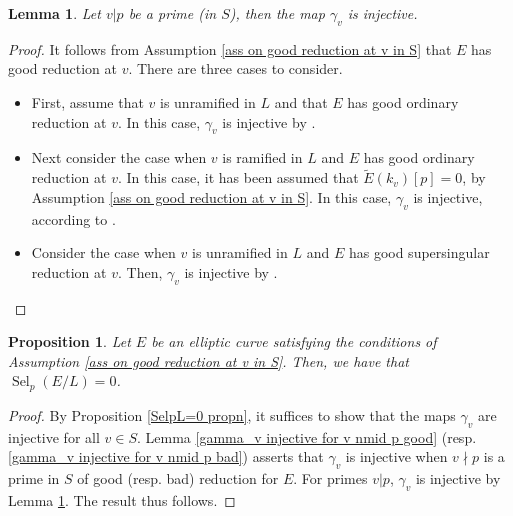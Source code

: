 \documentclass[12pt]{amsart}
\newtheorem{lemma}[theorem]{Lemma}
\newtheorem{proposition}[theorem]{Proposition}
\newcommand{\op}[1]{\operatorname{#1}}
\numberwithin{equation}{section}
\begin{document}
\begin{lemma}\label{gamma_v injective for v mid p}
    Let $v|p$ be a prime (in $S$), then the map $\gamma_v$ is injective. 
\end{lemma}
\begin{proof}
    It follows from Assumption \ref{ass on good reduction at v in S} that $E$ has good reduction at $v$. There are three cases to consider. 
    \begin{itemize}
        \item First, assume that $v$ is unramified in $L$ and that $E$ has good ordinary reduction at $v$. In this case, $\gamma_v$ is injective by \cite[Proposition 5.9, (ii)]{brau2014selmer}.
        \item Next consider the case when $v$ is ramified in $L$ and $E$ has good ordinary reduction at $v$. In this case, it has been assumed that $\widetilde{E}(k_v)[p]=0$, by Assumption \ref{ass on good reduction at v in S}. In this case, $\gamma_v$ is injective, according to \cite[Proposition 5.9, (i)]{brau2014selmer}.
        \item Consider the case when $v$ is unramified in $L$ and $E$ has good supersingular reduction at $v$. Then, $\gamma_v$ is injective by \cite[Proposition 5.10, (ii)]{brau2014selmer}.
    \end{itemize}
     
\end{proof}

\begin{proposition}\label{p selmer over L = 0}
    Let $E$ be an elliptic curve satisfying the conditions of Assumption \ref{ass on good reduction at v in S}. Then, we have that $\op{Sel}_p(E/L)=0$. 
\end{proposition}
\begin{proof}
    By Proposition \ref{SelpL=0 propn}, it suffices to show that the maps $\gamma_v$ are injective for all $v\in S$. Lemma \ref{gamma_v injective for v nmid p good} (resp. \ref{gamma_v injective for v nmid p bad}) asserts that $\gamma_v$ is injective when $v\nmid p$ is a prime in $S$ of good (resp. bad) reduction for $E$. For primes $v|p$, $\gamma_v$ is injective by Lemma \ref{gamma_v injective for v mid p}. The result thus follows. 
\end{proof}
\end{document}
